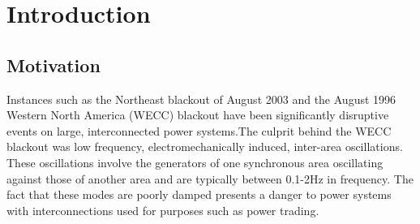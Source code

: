 \documentclass[conference]{IEEEtran}
\begin{document}
%
\IEEEpeerreviewmaketitle

\section{Introduction}
\subsection{Motivation}
Instances such as the Northeast blackout of August 2003 and the August 1996 Western North America (WECC)\cite{NAERC} blackout have been significantly disruptive events on large, interconnected power systems.The culprit behind the WECC blackout was low frequency, electromechanically induced, inter-area oscillations\cite{NAERC}. These oscillations involve the generators of one synchronous area oscillating against those of another area and are typically between 0.1-2Hz in frequency. The fact that these modes are poorly damped\cite{WAPODNorway} presents a danger to power systems with interconnections used for purposes such as power trading.
\end{document}
